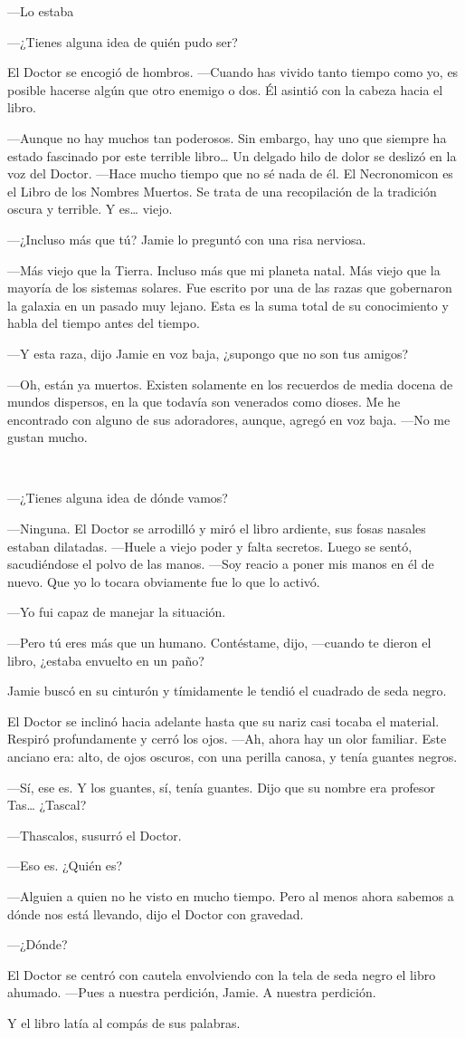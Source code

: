 ---Lo estaba

---¿Tienes alguna idea de quién pudo ser?

El Doctor se encogió de hombros. ---Cuando has vivido tanto tiempo como
yo, es posible hacerse algún que otro enemigo o dos. Él asintió con la
cabeza hacia el libro.

---Aunque no hay muchos tan poderosos. Sin embargo, hay uno que siempre
ha estado fascinado por este terrible libro\ldots{} Un delgado hilo de
dolor se deslizó en la voz del Doctor. ---Hace mucho tiempo que no sé
nada de él. El Necronomicon es el Libro de los Nombres Muertos. Se trata
de una recopilación de la tradición oscura y terrible. Y es\ldots{}
viejo.

---¿Incluso más que tú? Jamie lo preguntó con una risa nerviosa.

---Más viejo que la Tierra. Incluso más que mi planeta natal. Más viejo
que la mayoría de los sistemas solares. Fue escrito por una de las razas
que gobernaron la galaxia en un pasado muy lejano. Esta es la suma total
de su conocimiento y habla del tiempo antes del tiempo.

---Y esta raza, dijo Jamie en voz baja, ¿supongo que no son tus amigos?

---Oh, están ya muertos. Existen solamente en los recuerdos de media
docena de mundos dispersos, en la que todavía son venerados como dioses.
Me he encontrado con alguno de  sus adoradores, aunque, agregó en voz
baja. ---No me gustan mucho.

~

---¿Tienes alguna idea de dónde vamos?

---Ninguna. El Doctor se arrodilló y miró el libro ardiente, sus fosas
nasales estaban dilatadas. ---Huele a viejo poder y falta secretos.
Luego se sentó, sacudiéndose el polvo de las manos. ---Soy reacio a
poner mis manos en él de nuevo. Que yo lo tocara  obviamente fue lo que
lo activó.

---Yo fui capaz de manejar la situación.

---Pero tú eres más que un humano. Contéstame, dijo, ---cuando te dieron
el libro, ¿estaba envuelto en un paño?

Jamie buscó en su cinturón y tímidamente le tendió el cuadrado de seda
negro.

El Doctor se inclinó hacia adelante hasta que su nariz casi tocaba el
material. Respiró profundamente y cerró los ojos. ---Ah, ahora hay un
olor familiar. Este anciano era: alto, de ojos oscuros, con una perilla
canosa, y tenía guantes negros.

---Sí, ese es. Y los guantes, sí, tenía guantes. Dijo que su nombre era
profesor Tas\ldots{} ¿Tascal?

---Thascalos, susurró el Doctor.

---Eso es. ¿Quién es?

---Alguien a quien no he visto en mucho tiempo. Pero al menos ahora
sabemos a dónde nos está llevando, dijo el Doctor con gravedad.

---¿Dónde?

El Doctor se centró con cautela envolviendo con la tela de seda negro el
libro ahumado. ---Pues a nuestra perdición, Jamie. A nuestra perdición.

Y el libro latía al compás de sus palabras.